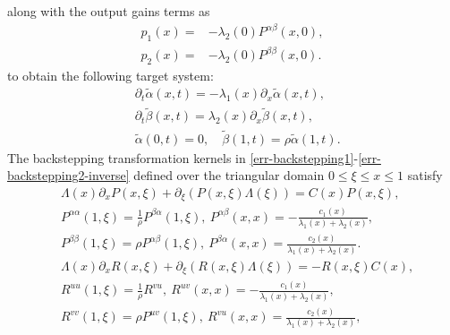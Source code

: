 \documentclass[letterpaper, 10 pt, conference]{ieeeconf}
\begin{document}
along with the output gains terms as
\begin{align}
p_1(x)=&-\lambda_2(0)P^{\alpha\beta}(x,0),\label{p1}\\
p_2(x)=&-\lambda_2(0)P^{\beta\beta}(x,0).\label{p2}
\end{align} 
to obtain the following target system:
\begin{align}
    &\partial_t \tilde{\alpha}(x,t) =-\lambda_1(x) \partial_x \tilde{\alpha}(x,t),\label{err-targetalpha} \\
    &\partial_t \tilde{\beta}(x,t)=\lambda_2(x) \partial_x \tilde{\beta}(x,t),\label{err-targetbeta}\\
    &\tilde{\alpha}(0,t)  =0, \quad
    \tilde{\beta}(1,t)  =\rho \tilde{\alpha}(1,t).\label{err-targetbc}
\end{align}
The backstepping transformation kernels in \eqref{err-backstepping1}-\eqref{err-backstepping2-inverse} defined over the triangular domain $0\leq\xi\leq x\leq1$ satisfy
\begin{align*}
&\Lambda(x)\partial_xP(x,\xi) + \partial_\xi(P(x,\xi)\Lambda(\xi))=C(x)P(x,\xi),\\
&P^{\alpha\alpha}(1,\xi)=\tfrac{1}{\rho}P^{\beta\alpha}(1,\xi),
~P^{\alpha\beta}(x,x)=-\tfrac{c_1(x)}{\lambda_1(x)+\lambda_2(x)},\\
&P^{\beta\beta}(1,\xi)=\rho P^{\alpha\beta}(1,\xi),
~P^{\beta\alpha}(x,x)=\tfrac{c_2(x)}{\lambda_1(x)+\lambda_2(x)}.\\
&\Lambda(x)\partial_xR(x,\xi) + \partial_\xi(R(x,\xi)\Lambda(\xi))=-R(x,\xi)C(x),\\
&R^{uu}(1,\xi)=\tfrac{1}{\rho}R^{vu},
~R^{uv}(x,x)=-\tfrac{c_1(x)}{\lambda_1(x)+\lambda_2(x)},\\
&R^{vv}(1,\xi)=\rho P^{uv}(1,\xi),
~R^{vu}(x,x)=\tfrac{c_2(x)}{\lambda_1(x)+\lambda_2(x)},
\end{align*}
\end{document}
